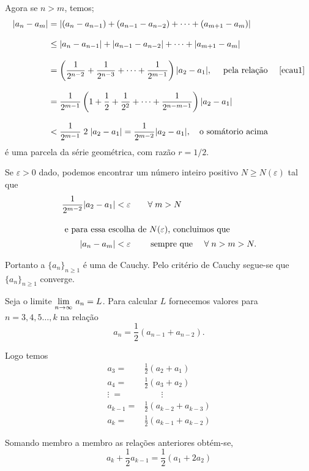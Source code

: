 Agora se $n>m$, temos;
\begin{align*}
 |a_n-a_m| & =|(a_n-a_{n-1})+(a_{n-1}-a_{n-2})+\cdots+(a_{m+1}-a_{m})| \\[2ex]
  & \leq |a_n-a_{n-1}|+|a_{n-1}-a_{n-2}|+\cdots+|a_{m+1}-a_{m}|     \\[2ex]
  &
  =\left(\frac{1}{2^{n-2}}+\frac{1}{2^{n-3}}+\cdots+\frac{1}{2^{m-1}}
  \right)|a_2-a_1|,\quad \text{ pela rela\c{c}\~{a}o }\quad \eqref{ecau1}\\[2ex]
  &=\frac{1}{2^{m-1}}\left(1+\frac{1}{2}+\frac{1}{2^{2}}+\cdots+\frac{1}{2^{n-m-1}}
  \right)|a_2-a_1|\\[2ex]
  &<\frac{1}{2^{m-1}}\;2\;|a_2-a_1|=\frac{1}{2^{m-2}}|a_2-a_1|, \quad\text{o som\'{a}torio acima  }
\end{align*}
\'{e} uma parcela da s\'{e}rie geom\'{e}trica, com raz\~{a}o $r=1/2$.

 Se $\varepsilon>0$ dado, podemos encontrar um n\'{u}mero inteiro positivo $N\geq N(\varepsilon)$ tal que
\begin{align*}
  \frac{1}{2^{m-2}}|a_2-a_1| &<\varepsilon\qquad \forall\; m>N \\[2ex]
  \intertext{ e para essa escolha de $N(\varepsilon)$, concluimos que }
|a_n-a_m| &<\varepsilon\qquad\text{ sempre que }\quad \forall\; n>m>N.
\end{align*}

Portanto a \seq $\{a_n\}_{n\geq 1}$ \'{e} uma \seq de Cauchy. Pelo
crit\'{e}rio de Cauchy segue-se que $\{a_n\}_{n\geq 1}$ converge.

Seja o limite $\displaystyle{\lim_{n\to\infty}\,a_n=L}$. Para calcular $L$
fornecemos valores para $n=3,4,5\ldots,k$ na rela\c{c}\~{a}o
\begin{equation*}
  a_n=\frac{1}{2}(a_{n-1}+a_{n-2}).
\end{equation*}

Logo temos
\begin{align*}
a_3=&\frac{1}{2}(a_{2}+a_{1})\\[2ex]
a_4=&\frac{1}{2}(a_{3}+a_{2})\\[2ex]
\vdots\;=&\qquad\vdots\\[2ex]
a_{k-1}=&\frac{1}{2}(a_{k-2}+a_{k-3})\\[2ex]
a_k=&\frac{1}{2}(a_{k-1}+a_{k-2})
\end{align*}

Somando membro a membro as rela\c{c}\~{o}es anteriores obt\'{e}m-se,
\begin{equation*}
 a_k+\frac{1}{2}a_{k-1}=\frac{1}{2}(a_1+2a_2 )
\end{equation*}


